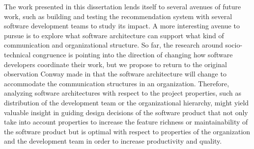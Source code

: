 The work presented in this dissertation lends itself to several avenues of future work, such as building and testing the recommendation system with several software development teams to study its impact.
A more interesting avenue to pursue is to explore what software architecture can support what kind of communication and organizational structure.
So far, the research around socio-technical congruence is pointing into the direction of changing how software developers coordinate their work, but we propose to return to the original observation Conway made in that the software architecture will change to accommodate the communication structures in an organization.
Therefore, analyzing software architectures with respect to the project properties, such as distribution of the development team or the organizational hierarchy, might yield valuable insight in guiding design decisions of the software product that not only take into account properties to increase the feature richness or maintainability of the software product but is optimal with respect to properties of the organization and the development team in order to increase productivity and quality. 
